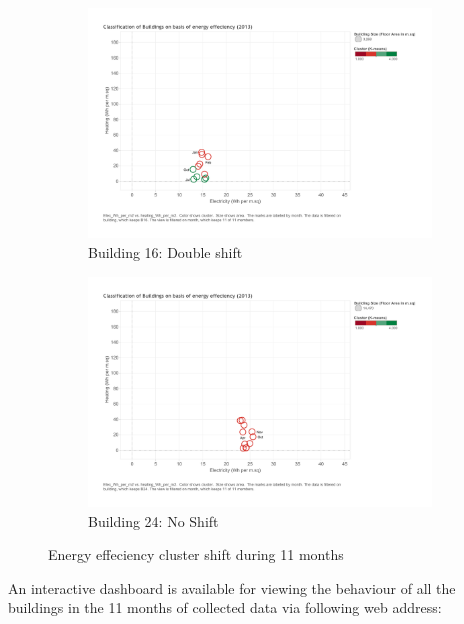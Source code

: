 \begin{figure}
        \begin{subfigure}[b]{0.45\textwidth}
                \includegraphics[width=\textwidth]{images/kmeans_B16_2c.pdf}
                \caption{Building 16: Double shift}
                \label{fig:dbl}
        \end{subfigure}
        \begin{subfigure}[b]{0.45\textwidth}
                        \includegraphics[width=\textwidth]{images/kmeans_b24_no.pdf}
                        \caption{Building 24: No Shift}
                        \label{fig:single}
       \end{subfigure}
     \caption{Energy effeciency cluster shift during 11 months}\label{fig:clustershift}
\end{figure}

An interactive dashboard is available for viewing the behaviour of all the buildings in the 11 months of collected data via following web address:


